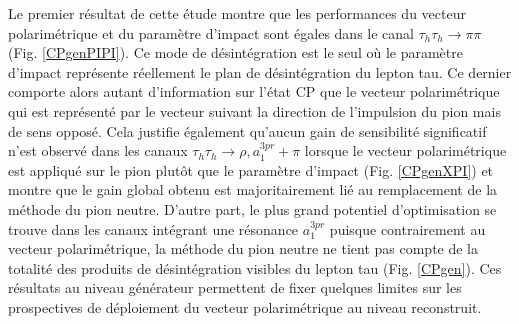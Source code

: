 Le premier résultat de cette étude montre que les performances du vecteur polarimétrique et du paramètre d'impact sont égales dans le canal $\tau_h\tau_h\rightarrow\pi\pi$ (Fig. \ref{CPgenPIPI}). Ce mode de désintégration est le seul où le paramètre d'impact représente réellement le plan de désintégration du lepton tau. Ce dernier comporte alors autant d'information sur l'état CP que le vecteur polarimétrique qui est représenté par le vecteur suivant la direction de l'impulsion du pion mais de sens opposé. Cela justifie également qu'aucun gain de sensibilité significatif n'est observé dans les canaux $\tau_h\tau_h\rightarrow\rho,a_1^{3pr}+\pi$ lorsque le vecteur polarimétrique est appliqué sur le pion plutôt que le paramètre d'impact (Fig. \ref{CPgenXPI}) et montre que le gain global obtenu est majoritairement lié au remplacement de la méthode du pion neutre. D'autre part, le plus grand potentiel d'optimisation se trouve dans les canaux intégrant une résonance $a_1^{3pr}$ puisque contrairement au vecteur polarimétrique, la méthode du pion neutre ne tient pas compte de la totalité des produits de désintégration visibles du lepton tau (Fig. \ref{CPgen}). Ces résultats au niveau générateur permettent de fixer quelques limites sur les prospectives de déploiement du vecteur polarimétrique au niveau reconstruit.  \\ 


